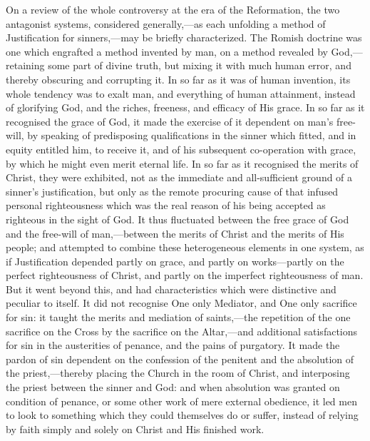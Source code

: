 \documentclass[
]{book}
\begin{document}
On a review of the whole controversy at the era of the Reformation, the two antagonist systems, considered generally,---as each unfolding a method of Justification for sinners,---may be briefly characterized. The Romish doctrine was one which engrafted a method invented by man, on a method revealed by God,---retaining some part of divine truth, but mixing it with much human error, and thereby obscuring and corrupting it. In so far as it was of human invention, its whole tendency was to exalt man, and everything of human attainment, instead of glorifying God, and the riches, freeness, and efficacy of His grace. In so far as it recognised the grace of God, it made the exercise of it dependent on man's free-will, by speaking of predisposing qualifications in the sinner which fitted, and in equity entitled him, to receive it, and of his subsequent co-operation with grace, by which he might even merit eternal life. In so far as it recognised the merits of Christ, they were exhibited, not as the immediate and all-sufficient ground of a sinner's justification, but only as the remote procuring cause of that infused personal righteousness which was the real reason of his being accepted as righteous in the sight of God. It thus fluctuated between the free grace of God and the free-will of man,---between the merits of Christ and the merits of His people; and attempted to combine these heterogeneous elements in one system, as if Justification depended partly on grace, and partly on works---partly on the perfect righteousness of Christ, and partly on the imperfect righteousness of man. But it went beyond this, and had characteristics which were distinctive and peculiar to itself. It did not recognise One only Mediator, and One only sacrifice for sin: it taught the merits and mediation of saints,---the repetition of the one sacrifice on the Cross by the sacrifice on the Altar,---and additional satisfactions for sin in the austerities of penance, and the pains of purgatory. It made the pardon of sin dependent on the confession of the penitent and the absolution of the priest,---thereby placing the Church in the room of Christ, and interposing the priest between the sinner and God: and when absolution was granted on condition of penance, or some other work of mere external obedience, it led men to look to something which they could themselves do or suffer, instead of relying by faith simply and solely on Christ and His finished work.
\end{document}
